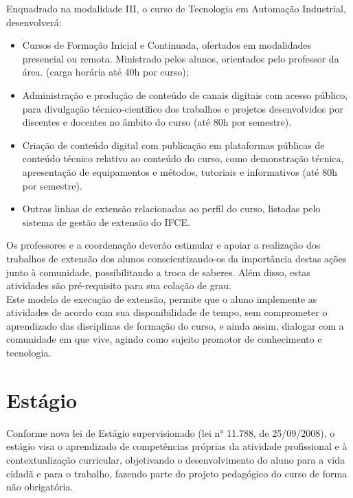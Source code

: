 Enquadrado na modalidade III, o curso de Tecnologia em Automação Industrial, desenvolverá:\\

\begin{itemize}
\item Cursos de Formação Inicial e Continuada, ofertados em modalidades presencial ou remota. Ministrado pelos alunos, orientados pelo professor da área. (carga horária até 40h por curso);
\item Administração e produção de conteúdo de canais digitais com acesso público, para divulgação técnico-científico dos trabalhos e projetos desenvolvidos por discentes e docentes no âmbito do curso (até 80h por semestre).
\item Criação de conteúdo digital com publicação em plataformas públicas de conteúdo técnico relativo ao conteúdo do curso, como demonstração técnica, apresentação de equipamentos e métodos, tutoriais e informativos (até 80h por semestre).
\item Outras linhas de extensão relacionadas ao perfil do curso, listadas pelo sistema de gestão de extensão do IFCE.
\end{itemize}

Os professores e a coordenação deverão estimular e apoiar a realização dos trabalhos de extensão dos alunos conscientizando-os da importância destas ações junto à comunidade, possibilitando a troca de saberes. Além disso, estas atividades são pré-requisito para sua colação de grau.\\

Este modelo de execução de extensão, permite que o aluno implemente as atividades de acordo com sua disponibilidade de tempo, sem comprometer o aprendizado das disciplinas de formação do curso, e ainda assim, dialogar com a comunidade em que vive, agindo como sujeito promotor de conhecimento e tecnologia.\\

\chapter{Estágio}

Conforme nova lei de Estágio supervisionado (lei n° 11.788, de 25/09/2008), o estágio visa o aprendizado de competências próprias da atividade profissional e à contextualização curricular, objetivando o desenvolvimento do aluno para a vida cidadã e para o trabalho, fazendo parte do projeto pedagógico do curso de forma não obrigatória.\\

